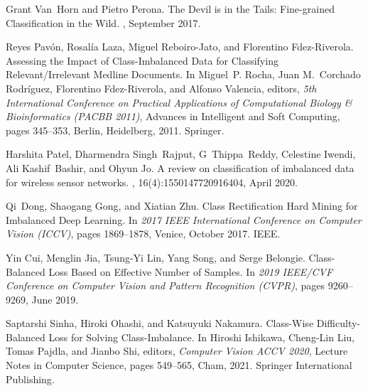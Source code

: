 \documentclass{article}
\begin{document}
\begin{thebibliography}{10}
  Grant Van~Horn and Pietro Perona.
  \newblock The {{Devil}} is in the {{Tails}}: Fine-grained {{Classification}} in
    the {{Wild}}.
  , September 2017.
  
  Reyes Pav{\'o}n, Rosal{\'i}a Laza, Miguel {Reboiro-Jato}, and Florentino
    {Fdez-Riverola}.
  \newblock Assessing the {{Impact}} of {{Class}}-{{Imbalanced Data}} for
    {{Classifying Relevant}}/{{Irrelevant Medline Documents}}.
  \newblock In Miguel~P. Rocha, Juan M.~Corchado Rodr{\'i}guez, Florentino
    {Fdez-Riverola}, and Alfonso Valencia, editors, {\em 5th {{International
    Conference}} on {{Practical Applications}} of {{Computational Biology}} \&
    {{Bioinformatics}} ({{PACBB}} 2011)}, Advances in {{Intelligent}} and {{Soft
    Computing}}, pages 345--353, {Berlin, Heidelberg}, 2011. {Springer}.
  
  Harshita Patel, Dharmendra Singh~Rajput, G~Thippa~Reddy, Celestine Iwendi, Ali
    Kashif~Bashir, and Ohyun Jo.
  \newblock A review on classification of imbalanced data for wireless sensor
    networks.
  ,
    16(4):1550147720916404, April 2020.
  
  Qi~Dong, Shaogang Gong, and Xiatian Zhu.
  \newblock Class {{Rectification Hard Mining}} for {{Imbalanced Deep Learning}}.
  \newblock In {\em 2017 {{IEEE International Conference}} on {{Computer Vision}}
    ({{ICCV}})}, pages 1869--1878, {Venice}, October 2017. {IEEE}.
  
  Yin Cui, Menglin Jia, Tsung-Yi Lin, Yang Song, and Serge Belongie.
  \newblock Class-{{Balanced Loss Based}} on {{Effective Number}} of {{Samples}}.
  \newblock In {\em 2019 {{IEEE}}/{{CVF Conference}} on {{Computer Vision}} and
    {{Pattern Recognition}} ({{CVPR}})}, pages 9260--9269, June 2019.
  
  Saptarshi Sinha, Hiroki Ohashi, and Katsuyuki Nakamura.
  \newblock Class-{{Wise Difficulty}}-{{Balanced Loss}} for {{Solving
    Class}}-{{Imbalance}}.
  \newblock In Hiroshi Ishikawa, Cheng-Lin Liu, Tomas Pajdla, and Jianbo Shi,
    editors, {\em Computer {{Vision}} \textendash{} {{ACCV}} 2020}, Lecture
    {{Notes}} in {{Computer Science}}, pages 549--565, {Cham}, 2021. {Springer
    International Publishing}.
  

\end{thebibliography}
\end{document}
